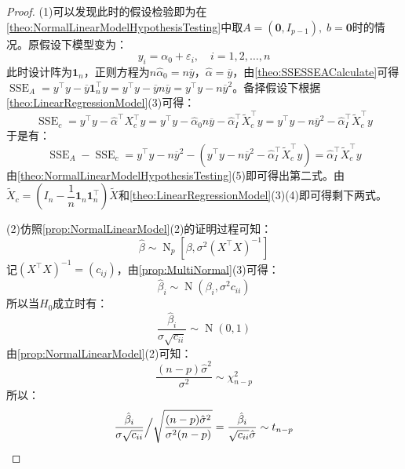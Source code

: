 \begin{proof}
	(1)可以发现此时的假设检验即为在\cref{theo:NormalLinearModelHypothesisTesting}中取$A=(\mathbf{0},I_{p-1}),\;b=\mathbf{0}$时的情况。原假设下模型变为：
	\begin{equation*}
		y_i=\alpha_0+\varepsilon_i,\quad i=1,2,\dots,n
	\end{equation*}
		此时设计阵为$\mathbf{1}_n$，正则方程为$n\hat{\alpha}_0=n\overline{y}$，$\hat{\alpha}=\overline{y}$，由\cref{theo:SSESSEACalculate}可得$\operatorname{SSE}_A=y^{\top}y-\overline{y}\mathbf{1}_n^{\top}y=y^{\top}y-\overline{y}n\overline{y}=y^{\top}y-n\overline{y}^2$。备择假设下根据\cref{theo:LinearRegressionModel}(3)可得：
	\begin{equation*}
		\operatorname{SSE}_c=y^{\top}y-\hat{\alpha}^{\top}X_c^{\top}y=y^{\top}y-\hat{\alpha}_0n\overline{y}-\hat{\alpha}_I^{\top}\tilde{X}_c^{\top}y=y^{\top}y-n\overline{y}^2-\hat{\alpha}_I^{\top}\tilde{X}_c^{\top}y
	\end{equation*}
	于是有：
	\begin{equation*}
		\operatorname{SSE}_A-\operatorname{SSE}_c=y^{\top}y-n\overline{y}^2-(y^{\top}y-n\overline{y}^2-\hat{\alpha}_I^{\top}\tilde{X}_c^{\top}y)=\hat{\alpha}_I^{\top}\tilde{X}_c^{\top}y
	\end{equation*}
	由\cref{theo:NormalLinearModelHypothesisTesting}(5)即可得出第二式。由$\tilde{X}_c=\left(I_n-\dfrac{1}{n}\mathbf{1}_n\mathbf{1}_n^{\top}\right)\tilde{X}$和\cref{theo:LinearRegressionModel}(3)(4)即可得剩下两式。\par
	(2)仿照\cref{prop:NormalLinearModel}(2)的证明过程可知：
	\begin{equation*}
		\hat{\beta}\sim\operatorname{N}_p[\beta,\sigma^2(X^{\top}X)^{-1}]
	\end{equation*}
	记$(X^{\top}X)^{-1}=(c_{ij})$，由\cref{prop:MultiNormal}(3)可得：
	\begin{equation*}
		\hat{\beta}_i\sim\operatorname{N}(\beta_i,\sigma^2c_{ii})
	\end{equation*}
	所以当$H_0$成立时有：
	\begin{equation*}
		\frac{\hat{\beta}_i}{\sigma\sqrt{c_{ii}}}\sim\operatorname{N}(0,1)
	\end{equation*}
	由\cref{prop:NormalLinearModel}(2)可知：
	\begin{equation*}
		\frac{(n-p)\hat{\sigma}^2}{\sigma^2}\sim\chi_{n-p}^2
	\end{equation*}
	所以：
	\begin{equation*}
		\frac{\hat{\beta}_i}{\sigma\sqrt{c_{ii}}}\Big/\sqrt{\frac{(n-p)\hat{\sigma}^2}{\sigma^2(n-p)}}=\frac{\hat{\beta}_i}{\sqrt{c_{ii}}\hat{\sigma}}\sim t_{n-p}\qedhere
	\end{equation*}
\end{proof}
